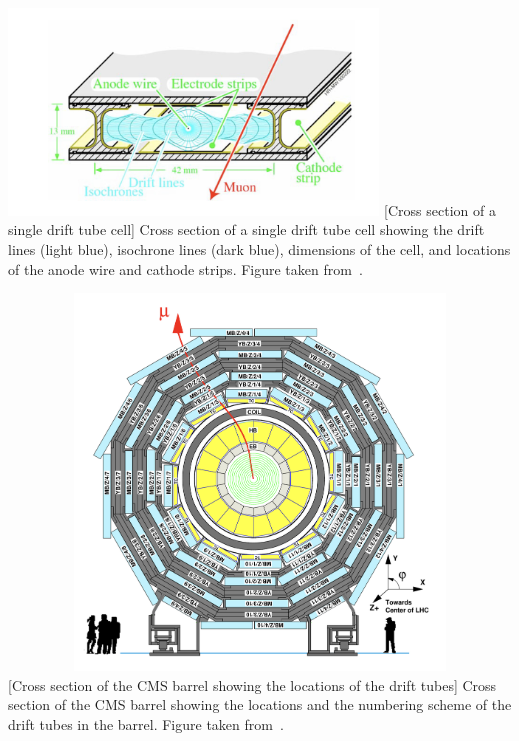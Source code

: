 \begin{multiFigure}
    \centering
        \includegraphics[height=5.5cm,keepaspectratio]{figures/cms/muonsys/drifttube_xs.jpeg}
        [Cross section of a single drift tube cell]
        {Cross section of a single drift tube cell showing the drift lines (light blue), isochrone lines (dark blue), dimensions of the cell, and locations of the anode wire and cathode strips.
        Figure taken from~\cite{collaboration_cms_2008}.}
    \label{fig:dt_cell}
\end{multiFigure}
\begin{multiFigure}
    \centering
        \includegraphics[width=15cm,height=10cm,keepaspectratio]{figures/cms/muonsys/drifttube_locations.jpeg}
        [Cross section of the CMS barrel showing the locations of the drift tubes]
        {Cross section of the CMS barrel showing the locations and the numbering scheme of the drift tubes in the barrel.
        Figure taken from~\cite{collaboration_cms_2008}.}
    \label{fig:dt_locations}
\end{multiFigure}

